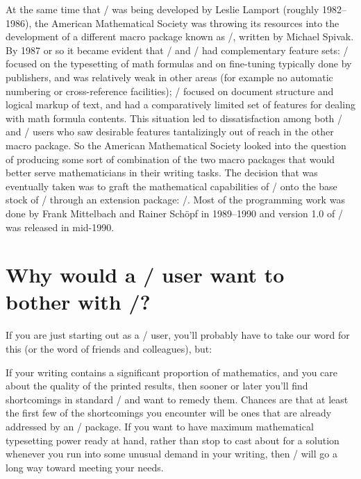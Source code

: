 \documentclass[leqno,titlepage,openany]{amsldoc}
\begin{document}
At the same time that \latex/ was being developed by Leslie
Lamport (roughly 1982--1986), the American
Mathematical Society was throwing its resources into the development of
a different macro package known as \amstex/,
written by Michael Spivak. By 1987 or so it
became evident that \amstex/ and \latex/ had complementary feature sets:
\amstex/ focused on the typesetting of math formulas and on fine-tuning
typically done by publishers, and was relatively weak in other areas
(for example no automatic numbering or cross-reference facilities);
\latex/ focused on document structure and logical markup of text, and
had a comparatively limited set of features for dealing with math
formula contents. This situation led to dissatisfaction among both
\amstex/ and \latex/ users who saw desirable features tantalizingly out
of reach in the other macro package. So the American Mathematical
Society looked into the question of producing some sort of combination
of the two macro packages that would better serve mathematicians in
their writing tasks. The decision that was eventually taken was to graft
the mathematical capabilities of \amstex/ onto the base stock of \latex/
through an extension package: \amslatex/. Most of the programming work
was done by Frank Mittelbach and Rainer
Sch\"opf in 1989--1990 and version 1.0 of
\amslatex/ was released in mid-1990.

\section*{Why would a \latex/ user want to bother with \amslatex/?}

\leavevmode
{}
%
If you are just starting out as a \latex/ user, you'll probably have to
take our word for this (or the word of friends and colleagues), but:

If your writing contains a significant proportion of mathematics, and
you care about the quality of the printed results, then sooner or
later you'll find shortcomings in standard \latex/ and want to remedy
them. Chances are that at least the first few of the shortcomings you
encounter will be ones that are already addressed by an \amslatex/
package. If you want to have maximum mathematical typesetting power
ready at hand, rather than stop to cast about for a solution whenever
you run into some unusual demand in your writing, then \amslatex/ will
go a long way toward meeting your needs.
\end{document}
